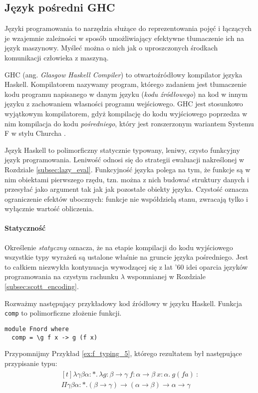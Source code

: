 \subsection{Język pośredni GHC}

Języki programowania to narzędzia służące do reprezentowania pojęć i łączących je wzajemnie zależności w sposób umożliwiający efektywne tłumaczenie ich na język maszynowy. Myśleć można o nich jak o uproszczonych środkach komunikacji człowieka z maszyną.

GHC (ang. \emph{Glasgow Haskell Compiler}) to otwartoźródłowy kompilator języka Haskell. Kompilatorem nazywamy program, którego zadaniem jest tłumaczenie kodu programu napisanego w danym języku (\emph{kodu źródłowego}) na kod w innym języku z zachowaniem własności programu wejściowego. GHC jest stosunkowo wyjątkowym kompilatorem, gdyż kompilację do kodu wyjściowego poprzedza w nim kompilacja do kodu \emph{pośredniego}, który jest rozszerzonym wariantem Systemu F w stylu Churcha \cite{Sulzmann2007}. 

Język Haskell to polimorficzny statycznie typowany, leniwy, czysto funkcyjny język programowania. Leniwość odnosi się do strategii ewaluacji nakreślonej w Rozdziale \ref{subsec:lazy_eval}. Funkcyjność języka polega na tym, że funkcje są w nim obiektami pierwszego rzędu, tzn. można z nich budować struktury danych i przesyłać jako argument tak jak jak pozostałe obiekty języka. Czystość oznacza ograniczenie efektów ubocznych: funkcje nie współdzielą stanu, zwracają tylko i wyłącznie wartość obliczenia. 

\paragraph{Statyczność}
Określenie \emph{statyczny} oznacza, że na etapie kompilacji do kodu wyjściowego wszystkie typy wyrażeń są ustalone właśnie na gruncie języka pośredniego. Jest to całkiem niezwykła kontynuacja wywodzącej się z lat '60 idei oparcia języków programowania na czystym rachunku \(\lambda\) wspomnianej w Rozdziale \ref{subsec:scott_encoding}.

Rozważmy następujący przykładowy kod źródłowy w języku Haskell. Funkcja \texttt{comp} to polimorficzne złożenie funkcji.

\begin{verbatim}
module Fnord where
  comp = \g f x -> g (f x)
\end{verbatim}

Przypomnijmy Przykład \ref{ex:f_typing_5}, którego rezultatem był następujące przypisanie typu:
\begin{align}
  \begin{aligned}[t]
\lambda \gamma \beta \alpha:*.\,\lambda g: \beta \to \gamma\  f:\alpha\to\beta\ x:\alpha.\ g(f a)\ :\\
\Pi\gamma\beta\alpha:*.(\beta\to\gamma)\to(\alpha\to\beta)\to\alpha\to\gamma
  \end{aligned}\tag{\(\blacklozenge\)}\label{ex:typing_compar}
\end{align}

